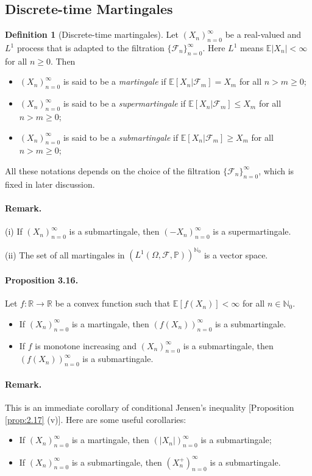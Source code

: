 \documentclass{article}
\numberwithin{equation}{section}
\newcommand{\E}{\mathbb{E}}
\renewcommand{\P}{\mathbb{P}}
\theoremstyle{plain}
\theoremstyle{definition}
\newtheorem{definition}[theorem]{Definition}
\begin{document}
\subsection{Discrete-time Martingales}
\begin{definition}[Discrete-time martingales]\label{def:3.15} Let $(X_n)_{n=0}^\infty$ be a real-valued and $L^1$ process that is adapted to the filtration $\{\mathscr{F}_n\}_{n=0}^\infty$. Here $L^1$ means $\E\vert X_n\vert<\infty$ for all $n\geq 0$. Then
\begin{itemize} 
\item[(i)] $(X_n)_{n=0}^\infty$ is said to be a \textit{martingale} if $\E[X_n|\mathscr{F}_m]=X_m$ for all $n>m\geq 0$;
\item[(ii)] $(X_n)_{n=0}^\infty$ is said to be a \textit{supermartingale} if $\E[X_n|\mathscr{F}_m]\leq X_m$ for all $n>m\geq 0$;
\item[(iii)] $(X_n)_{n=0}^\infty$ is said to be a \textit{submartingale} if $\E[X_n|\mathscr{F}_m]\geq X_m$ for all $n>m\geq 0$;
\end{itemize}
All these notations depends on the choice of the filtration $\{\mathscr{F}_n\}_{n=0}^\infty$, which is fixed in later discussion.
\end{definition}
\paragraph{Remark.} (i) If $(X_n)_{n=0}^\infty$ is a submartingale, then $(-X_n)_{n=0}^\infty$ is a supermartingale. \vspace{0.1cm}

(ii) The set of all martingales in $\left(L^1(\Omega,\mathscr{F},\P)\right)^{\mathbb{N}_0}$ is a vector space.

\paragraph{Proposition 3.16.\label{prop:3.16}} Let $f:\mathbb{R}\to\mathbb{R}$ be a convex function such that $\E[f(X_n)]<\infty$ for all $n\in\mathbb{N}_0$.
\begin{itemize}
	\item[(i)] If $(X_n)_{n=0}^\infty$ is a martingale, then $(f(X_n))_{n=0}^\infty$ is a submartingale.
	\item[(ii)] If $f$ is monotone increasing and $(X_n)_{n=0}^\infty$ is a submartingale, then $(f(X_n))_{n=0}^\infty$ is a submartingale.
\end{itemize}
\paragraph{Remark.} This is an immediate corollary of conditional Jensen's inequality [Proposition \ref{prop:2.17} (v)]. Here are some useful corollaries:
\begin{itemize}
	\item[(i)] If $(X_n)_{n=0}^\infty$ is a martingale, then $(\vert X_n\vert)_{n=0}^\infty$ is a submartingale; 
	\item[(ii)] If $(X_n)_{n=0}^\infty$ is a submartingale, then $(X_n^+)_{n=0}^\infty$ is a submartingale.
\end{itemize}
\end{document}
